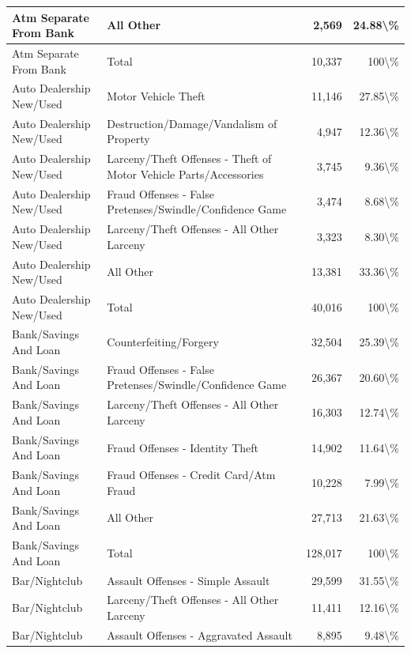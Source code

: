\documentclass[
]{krantz}
\begin{document}
\begin{longtable}[t]{l|l|r|r}
\hline
Atm Separate From Bank & All Other & 2,569 & 24.88\textbackslash{}\%\\
\hline
Atm Separate From Bank & Total & 10,337 & 100\textbackslash{}\%\\
\hline
Auto Dealership New/Used & Motor Vehicle Theft & 11,146 & 27.85\textbackslash{}\%\\
\hline
Auto Dealership New/Used & Destruction/Damage/Vandalism of Property & 4,947 & 12.36\textbackslash{}\%\\
\hline
Auto Dealership New/Used & Larceny/Theft Offenses - Theft of Motor Vehicle Parts/Accessories & 3,745 & 9.36\textbackslash{}\%\\
\hline
Auto Dealership New/Used & Fraud Offenses - False Pretenses/Swindle/Confidence Game & 3,474 & 8.68\textbackslash{}\%\\
\hline
Auto Dealership New/Used & Larceny/Theft Offenses - All Other Larceny & 3,323 & 8.30\textbackslash{}\%\\
\hline
Auto Dealership New/Used & All Other & 13,381 & 33.36\textbackslash{}\%\\
\hline
Auto Dealership New/Used & Total & 40,016 & 100\textbackslash{}\%\\
\hline
Bank/Savings And Loan & Counterfeiting/Forgery & 32,504 & 25.39\textbackslash{}\%\\
\hline
Bank/Savings And Loan & Fraud Offenses - False Pretenses/Swindle/Confidence Game & 26,367 & 20.60\textbackslash{}\%\\
\hline
Bank/Savings And Loan & Larceny/Theft Offenses - All Other Larceny & 16,303 & 12.74\textbackslash{}\%\\
\hline
Bank/Savings And Loan & Fraud Offenses - Identity Theft & 14,902 & 11.64\textbackslash{}\%\\
\hline
Bank/Savings And Loan & Fraud Offenses - Credit Card/Atm Fraud & 10,228 & 7.99\textbackslash{}\%\\
\hline
Bank/Savings And Loan & All Other & 27,713 & 21.63\textbackslash{}\%\\
\hline
Bank/Savings And Loan & Total & 128,017 & 100\textbackslash{}\%\\
\hline
Bar/Nightclub & Assault Offenses - Simple Assault & 29,599 & 31.55\textbackslash{}\%\\
\hline
Bar/Nightclub & Larceny/Theft Offenses - All Other Larceny & 11,411 & 12.16\textbackslash{}\%\\
\hline
Bar/Nightclub & Assault Offenses - Aggravated Assault & 8,895 & 9.48\textbackslash{}\%\\

\end{longtable}
\end{document}
